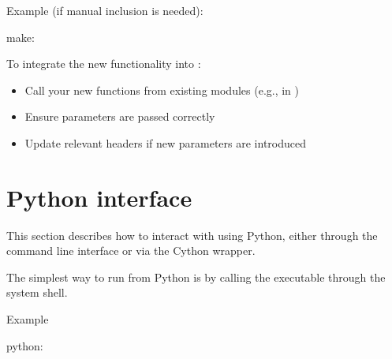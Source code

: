 \documentclass[letterpaper,10pt,english]{sphinxmanual}
\begin{document}
\sphinxAtStartPar
Example (if manual inclusion is needed):

\sphinxAtStartPar
make:

\begin{sphinxVerbatim}[commandchars=\\\{\}]
  
\end{sphinxVerbatim}

\sphinxAtStartPar
{}

\sphinxAtStartPar
To integrate the new functionality into :
\begin{itemize}
\item {} 
\sphinxAtStartPar
Call your new functions from existing modules (e.g., in )

\item {} 
\sphinxAtStartPar
Ensure parameters are passed correctly

\item {} 
\sphinxAtStartPar
Update relevant headers if new parameters are introduced

\end{itemize}

\sphinxstepscope


\chapter{Python interface}
\label{\detokenize{python:python-interface}}\label{\detokenize{python::doc}}
\sphinxAtStartPar
This section describes how to interact with  using Python, either through the command line interface or via the Cython wrapper.

\sphinxAtStartPar
{}

\sphinxAtStartPar
The simplest way to run  from Python is by calling the executable through the system shell.

\sphinxAtStartPar
Example

\sphinxAtStartPar
python:

\begin{sphinxVerbatim}[commandchars=\\\{\}]

\end{sphinxVerbatim}
\end{document}
